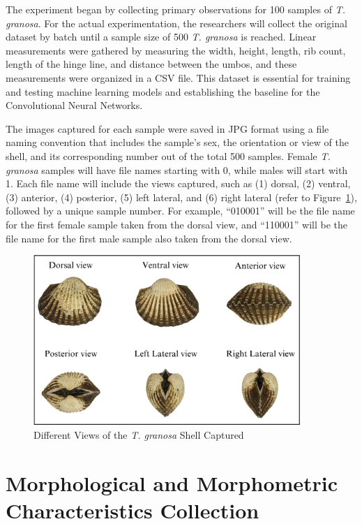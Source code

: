 The experiment began by collecting primary observations for 100 samples of \textit{T. granosa}. For the actual experimentation, the researchers will collect the original dataset by batch until a sample size of 500  \textit{T. granosa} is reached. Linear measurements were gathered by measuring the width, height, length, rib count, length of the hinge line, and distance between the umbos, and these measurements were organized in a CSV file. This dataset is essential for training and testing machine learning models and establishing the baseline for the Convolutional Neural Networks.

The images captured for each sample were saved in JPG format using a file naming convention that includes the sample's sex, the orientation or view of the shell, and its corresponding number out of the total 500 samples. Female \textit{T. granosa} samples will have file names starting with 0, while males will start with 1. Each file name will include the views captured, such as (1) dorsal, (2) ventral, (3) anterior, (4) posterior, (5) left lateral, and (6) right lateral (refer to Figure~\ref{fig:granosa_views}), followed by a unique sample number. For example, “010001” will be the file name for the first female sample taken from the dorsal view, and “110001” will be the file name for the first male sample also taken from the dorsal view. 

\begin{figure}[!htbp]
	\centering
	\includegraphics[width=0.9\textwidth]{figures/view.png}
	\caption{Different Views of the \textit{T. granosa} Shell Captured}
	\label{fig:granosa_views}
\end{figure}

\newpage
\section{Morphological and Morphometric Characteristics Collection}
\label{sec:morphochar}

